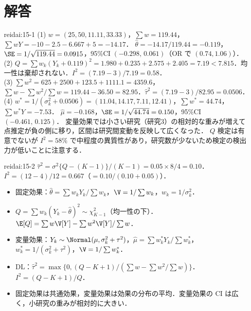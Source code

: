\section{解答}\label{sec:15-sol}
\enlargethispage{2\baselineskip}
\begin{kaitou}{reidai:15-1}
(1) $w=(25,50,11.11,33.33)$，$\sum w=119.44$，$\sum wY=-10-2.5-6.667+5=-14.17$．
$\hat\theta=-14.17/119.44=-0.119$，$\SE=1/\sqrt{119.44}=0.0915$，95\%CI $(-0.298,\,0.061)$（OR で $(0.74,1.06)$）．\\
(2) $Q=\sum w_k(Y_k+0.119)^2=1.980+0.235+2.575+2.405=7.19<7.815$．均一性は棄却されない．$I^2=(7.19-3)/7.19=0.58$．\\
(3) $\sum w^2=625+2500+123.5+1111.1=4359.6$，$\sum w-\sum w^2/\sum w=119.44-36.50=82.95$．$\hat\tau^2=(7.19-3)/82.95=0.0506$．\\
(4) $w^*=1/(\sigma_k^2+0.0506)=(11.04,14.17,7.11,12.41)$，$\sum w^*=44.74$，$\sum w^*Y=-7.53$．
$\hat\mu=-0.168$，$\SE=1/\sqrt{44.74}=0.150$，95\%CI $(-0.461,\,0.125)$．
変量効果では小さい研究（研究3）の相対的な重みが増えて点推定が負の側に移り，区間は研究間変動を反映して広くなった．
$Q$ 検定は有意でないが $I^2=58\%$ で中程度の異質性があり，研究数が少ないため検定の検出力が低いことに注意する．
\end{kaitou}

\begin{kaitou}{reidai:15-2}
$\hat\tau^2=\sigma^2\{Q-(K-1)\}/(K-1)=0.05\times8/4=0.10$．$I^2=(12-4)/12=0.667$（$=0.10/(0.10+0.05)$）．
\end{kaitou}

\begin{summarybox}
\begin{itemize}
\item 固定効果：$\hat\theta=\sum w_kY_k/\sum w_k$，$\V=1/\sum w_k$，$w_k=1/\sigma_k^2$．
\item $Q=\sum w_k(Y_k-\hat\theta)^2\sim\chi^2_{K-1}$（均一性の下）．$\E[Q]=\sum w\V[Y]-\sum w^2\V[Y]/\sum w$．
\item 変量効果：$Y_k\sim\Normal(\mu,\sigma_k^2+\tau^2)$，$\hat\mu=\sum w_k^*Y_k/\sum w_k^*$，$w_k^*=1/(\sigma_k^2+\tau^2)$，$\V=1/\sum w_k^*$．
\item DL：$\hat\tau^2=\max\{0,(Q-K+1)/(\sum w-\sum w^2/\sum w)\}$．$I^2=(Q-K+1)/Q$．
\item 固定効果は共通効果，変量効果は効果の分布の平均．変量効果の CI は広く，小研究の重みが相対的に大きい．
\end{itemize}
\end{summarybox}
